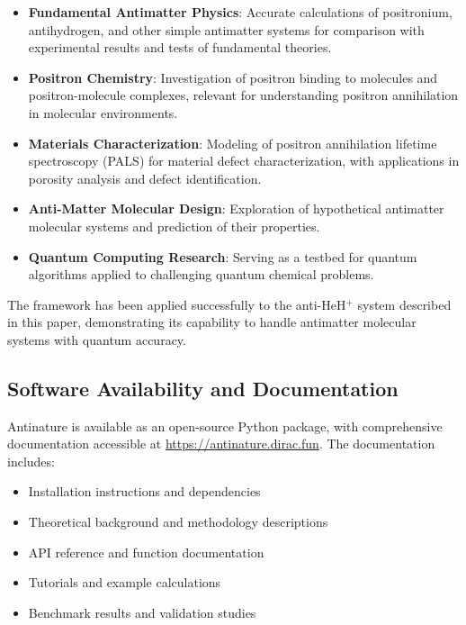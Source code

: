 \documentclass[10pt,twocolumn,a4paper]{article}
\begin{document}
\begin{itemize}
    \item \textbf{Fundamental Antimatter Physics}: Accurate calculations of positronium, antihydrogen, and other simple antimatter systems for comparison with experimental results and tests of fundamental theories.
    
    \item \textbf{Positron Chemistry}: Investigation of positron binding to molecules and positron-molecule complexes, relevant for understanding positron annihilation in molecular environments.
    
    \item \textbf{Materials Characterization}: Modeling of positron annihilation lifetime spectroscopy (PALS) for material defect characterization, with applications in porosity analysis and defect identification.
    
    \item \textbf{Anti-Matter Molecular Design}: Exploration of hypothetical antimatter molecular systems and prediction of their properties.
    
    \item \textbf{Quantum Computing Research}: Serving as a testbed for quantum algorithms applied to challenging quantum chemical problems.
\end{itemize}

The framework has been applied successfully to the anti-HeH$^+$ system described in this paper, demonstrating its capability to handle antimatter molecular systems with quantum accuracy.

\subsection{Software Availability and Documentation}
Antinature is available as an open-source Python package, with comprehensive documentation accessible at \url{https://antinature.dirac.fun}. The documentation includes:

\begin{itemize}
    \item Installation instructions and dependencies
    \item Theoretical background and methodology descriptions
    \item API reference and function documentation
    \item Tutorials and example calculations
    \item Benchmark results and validation studies
\end{itemize}
\end{document}
